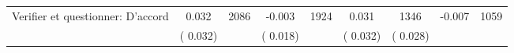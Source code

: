 \begin{tabular}{l*{8}{c}}
Verifier et questionner: D'accord        &              0.032      &       2086       &             -0.003      &       1924       &              0.031      &       1346  &       -0.007 &       1059       \\
                       &       (       0.032)            &                               &       (       0.018)            &                               &       (       0.032)            &       (       0.028) &                  \\
\hline \end{tabular}